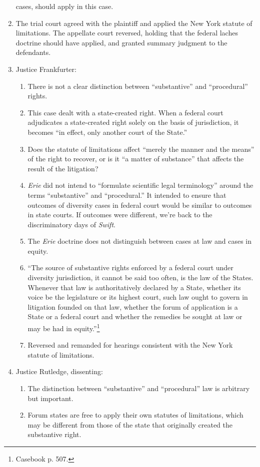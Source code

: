\begin{enumerate}
    cases, should apply in this case.
    \item The trial court agreed with the plaintiff and applied the New York 
    statute of limitations. The appellate court reversed, holding that the 
    federal laches doctrine should have applied, and granted summary judgment 
    to the defendants.
    \item Justice Frankfurter:
    \begin{enumerate}
        \item There is not a clear distinction between ``substantive'' and 
        ``procedural'' rights.
        \item This case dealt with a state-created right. When a federal court 
        adjudicates a state-created right solely on the basis of jurisdiction, 
        it becomes ``in effect, only another court of the State.''
        \item Does the statute of limitations affect ``merely the manner and 
        the means'' of the right to recover, or is it ``a matter of 
        substance'' that affects the result of the litigation?
        \item \emph{Erie} did not intend to ``formulate scientific legal 
        terminology'' around the terms ``substantive'' and ``procedural.'' It 
        intended to ensure that outcomes of diversity cases in federal court 
        would be similar to outcomes in state courts. If outcomes were 
        different, we're back to the discriminatory days of \emph{Swift}.
        \item The \emph{Erie} doctrine does not distinguish between cases at 
        law and cases in equity.
        \item ``The source of substantive rights enforced by a federal court 
        under diversity jurisdiction, it cannot be said too often, is the law 
        of the States. Whenever that law is authoritatively declared by a 
        State, whether its voice be the legislature or its highest court, such 
        law ought to govern in litigation founded on that law, whether the 
        forum of application is a State or a federal court and whether the 
        remedies be sought at law or may be had in equity.''\footnote{Casebook 
        p. 507.}
        \item Reversed and remanded for hearings consistent with the New York 
        statute of limitations.
    \end{enumerate}
    \item Justice Rutledge, dissenting:
    \begin{enumerate}
        \item The distinction between ``substantive'' and ``procedural'' law 
        is arbitrary but important.
        \item Forum states are free to apply their own statutes of 
        limitations, which may be different from those of the state that 
        originally created the substantive right.
    \end{enumerate}
\end{enumerate}

